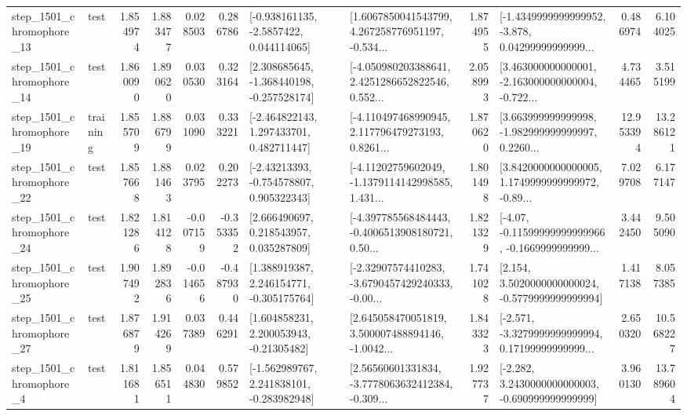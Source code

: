 \begin{tabular}{llrrrrllrlrr}
 step\_1501\_chromophore\_13 &      test &      1.854974 &    1.883477 &      0.028503 &  0.286786 &     [-0.938161135, -2.5857422, 0.044114065] &  [1.6067850041543799, 4.267258776951197, -0.534... &       1.874955 &  [-1.4349999999999952, -3.878, 0.04299999999999... &            0.486974 &          6.104025 \\
 step\_1501\_chromophore\_14 &      test &      1.860090 &    1.890620 &      0.030530 &  0.323164 &   [2.308685645, -1.368440198, -0.257528174] &  [-4.050980203388641, 2.4251286652822546, 0.552... &       2.058993 &  [3.463000000000001, -2.163000000000004, -0.722... &            4.734465 &          3.515199 \\
 step\_1501\_chromophore\_19 &  training &      1.855709 &    1.886799 &      0.031090 &  0.333221 &    [-2.464822143, 1.297433701, 0.482711447] &  [-4.110497468990945, 2.117796479273193, 0.8261... &       1.870620 &  [3.663999999999998, -1.982999999999997, 0.2260... &           12.953394 &         13.286121 \\
 step\_1501\_chromophore\_22 &      test &      1.857668 &    1.881463 &      0.023795 &  0.202273 &    [-2.43213393, -0.754578807, 0.905322343] &  [-4.11202759602049, -1.1379114142998585, 1.431... &       1.801498 &  [3.8420000000000005, 1.1749999999999972, -0.89... &            7.029708 &          6.177147 \\
 step\_1501\_chromophore\_24 &      test &      1.821286 &    1.814128 &     -0.007159 & -0.353352 &     [2.666490697, 0.218543957, 0.035287809] &  [-4.397785568484443, -0.4006513908180721, 0.50... &       1.821329 &  [-4.07, -0.11599999999999966, -0.1669999999999... &            3.442450 &          9.505090 \\
 step\_1501\_chromophore\_25 &      test &      1.907492 &    1.892836 &     -0.014656 & -0.487930 &    [1.388919387, 2.246154771, -0.305175764] &  [-2.32907574410283, -3.6790457429240333, -0.00... &       1.741028 &   [2.154, 3.5020000000000024, -0.5779999999999994] &            1.417138 &          8.057385 \\
 step\_1501\_chromophore\_27 &      test &      1.876879 &    1.914269 &      0.037389 &  0.446291 &     [1.604858231, 2.200053943, -0.21305482] &  [2.645058470051819, 3.500007488894146, -1.0042... &       1.843323 &  [-2.571, -3.3279999999999994, 0.17199999999999... &            2.650320 &         10.568227 \\
  step\_1501\_chromophore\_4 &      test &      1.811681 &    1.856511 &      0.044830 &  0.579852 &   [-1.562989767, 2.241838101, -0.283982948] &  [2.56560601331834, -3.7778063632412384, -0.309... &       1.927737 &   [-2.282, 3.2430000000000003, -0.690999999999999] &            3.960130 &         13.789604 \\

\end{tabular}
